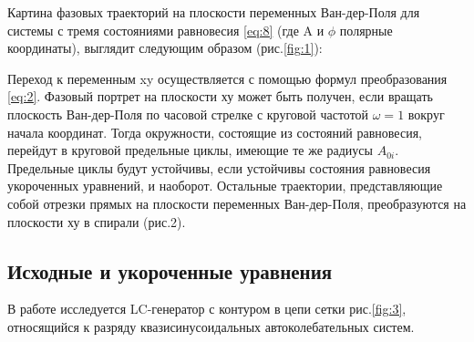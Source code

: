 Картина фазовых траекторий на плоскости переменных Ван-дер-Поля для системы с тремя состояниями равновесия \eqref{eq:8} (где A и $\phi$ полярные координаты), выглядит следующим образом (рис.\ref{fig:1}): 

Переход к переменным xy осуществляется с помощью формул преобразования  \eqref{eq:2}. Фазовый портрет на плоскости ху может быть получен, если вращать плоскость Ван-дер-Поля по часовой стрелке с круговой частотой $\omega=1$ вокруг начала координат. Тогда окружности, состоящие из состояний равновесия, перейдут в круговой предельные циклы, имеющие те же радиусы $A_{0i}$. Предельные циклы будут устойчивы, если устойчивы состояния равновесия укороченных уравнений, и наоборот. Остальные траектории, представляющие собой отрезки прямых на плоскости переменных Ван-дер-Поля, преобразуются на плоскости ху в спирали (рис.2).

\subsection{Исходные и укороченные уравнения}

В работе исследуется LC-генератор с контуром в цепи сетки рис.\ref{fig:3}, относящийся к разряду квазисинусоидальных автоколебательных систем.

